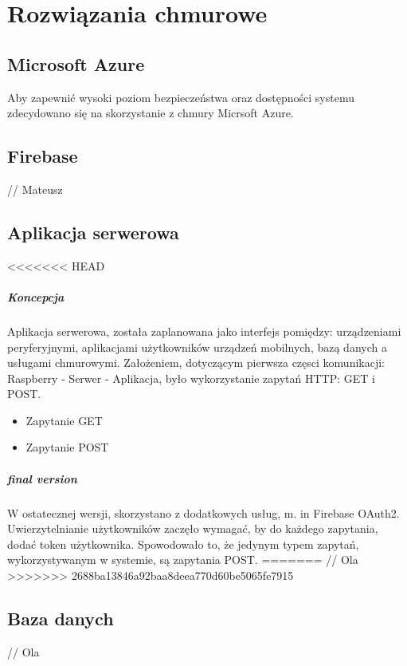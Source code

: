 \chapter{Rozwiązania chmurowe}

\section*{Microsoft Azure}

Aby zapewnić wysoki poziom bezpieczeństwa oraz dostępności systemu zdecydowano się na skorzystanie z chmury Micrsoft Azure.

\section*{Firebase}

// Mateusz

\section*{Aplikacja serwerowa}

<<<<<<< HEAD
\paragraph{Koncepcja}
Aplikacja serwerowa, została zaplanowana jako interfejs pomiędzy: urządzeniami peryferyjnymi, aplikacjami użytkowników urządzeń mobilnych, bazą danych a usługami chmurowymi.
Założeniem, dotyczącym pierwsza częsci komunikacji: Raspberry - Serwer - Aplikacja, było wykorzystanie zapytań HTTP: GET i POST.
\begin{itemize}
\item Zapytanie GET 
\item Zapytanie POST
\end{itemize}

\paragraph{final version}
W ostatecznej wersji, skorzystano z dodatkowych usług, m. in Firebase OAuth2. Uwierzytelnianie użytkowników zaczęło wymagać, by do każdego zapytania, dodać token użytkownika. Spowodowało to, że jedynym typem zapytań, wykorzystywanym w systemie, są zapytania POST. 
=======
// Ola
>>>>>>> 2688ba13846a92baa8deea770d60be5065fe7915

\section*{Baza danych}

// Ola